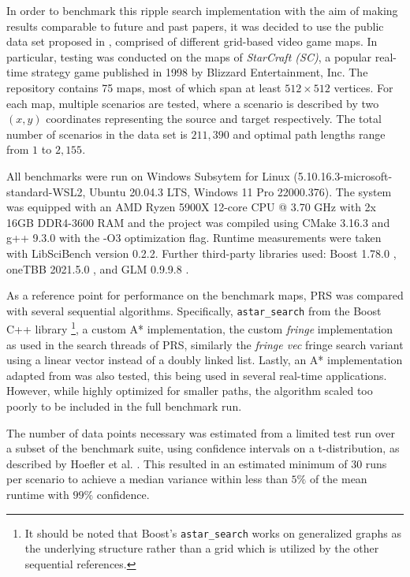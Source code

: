 In order to benchmark this ripple search implementation with the aim of making results comparable to future and past papers, it was decided to use the public data set proposed in \cite{6194296}, comprised of different grid-based video game maps. 
In particular, testing was conducted on the maps of \emph{StarCraft (SC)}, a popular real-time strategy game published in 1998 by Blizzard Entertainment, Inc. The repository contains 75 maps, most of which span at least $512 \times 512$ vertices.
For each map, multiple scenarios are tested, where a scenario is described by two $(x, y)$ coordinates representing the source and target respectively.
The total number of scenarios in the data set is $211,390$ and optimal path lengths range from $1$ to $2,155$.

All benchmarks were run on Windows Subsytem for Linux (5.10.16.3-microsoft-standard-WSL2, Ubuntu 20.04.3 LTS, Windows 11 Pro 22000.376).
The system was equipped with an AMD Ryzen 5900X 12-core CPU @ 3.70 GHz with 2x 16GB DDR4-3600 RAM and the project was compiled using CMake 3.16.3 and g++ 9.3.0 with the -O3 optimization flag. 
Runtime measurements were taken with LibSciBench \cite{libscibench} version 0.2.2. Further third-party libraries used: Boost 1.78.0 \cite{boost}, oneTBB 2021.5.0 \cite{oneTBB}, and GLM 0.9.9.8 \cite{glm}.

As a reference point for performance on the benchmark maps, PRS was compared with several sequential algorithms.
Specifically, 
\lstinline{astar_search} from the Boost C++ library
\footnote{It should be noted that Boost's \lstinline{astar_search} works on generalized graphs as the underlying structure rather than a grid which is utilized by the other sequential references.},
a custom A* implementation,
the custom \textit{fringe} implementation as used in the search threads of PRS,
similarly the \textit{fringe vec} fringe search variant using a linear vector instead of a doubly linked list.
Lastly, an A* implementation adapted from \cite{heyesAStar} was also tested, this being used in several real-time applications. However, while highly optimized for smaller paths, the algorithm scaled too poorly to be included in the full benchmark run.

The number of data points necessary was estimated from a limited test run over a subset of the benchmark suite, using confidence intervals on a t-distribution, as described by Hoefler et al. \cite{hoefler2015}. This resulted in an estimated minimum of $30$ runs per scenario to achieve a median variance within less than $5\%$ of the mean runtime with $99\%$ confidence.
